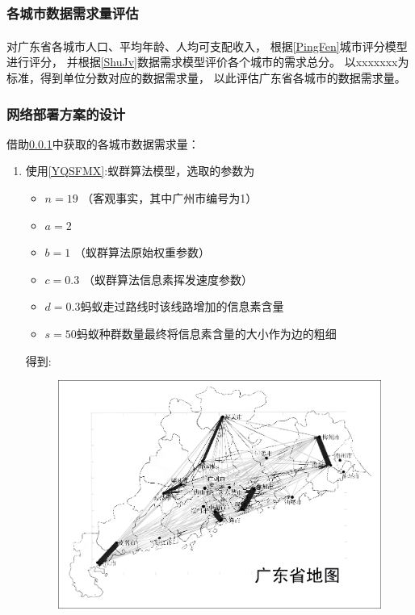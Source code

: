 \documentclass[UTF8,12pt]{ctexart}
\newcommand{\upcite}[1]{\textsuperscript{\cite{#1}}}
\begin{document}
        \subsubsection[网络需求评估]{各城市数据需求量评估}\label{WLXQPG}
            对广东省各城市人口、平均年龄、人均可支配收入\upcite{CSSJ}，
            根据\ref{PingFen}城市评分模型进行评分，
            并根据\ref{ShuJv}数据需求模型评价各个城市的需求总分。
            以xxxxxxx为标准，得到单位分数对应的数据需求量，
            以此评估广东省各城市的数据需求量。

        \subsubsection[网络部署方案]{网络部署方案的设计}    
            借助\ref{WLXQPG}中获取的各城市数据需求量：
            \begin{enumerate}
                \item 使用\ref{YQSFMX}:蚁群算法模型，选取的参数为
                    \begin{itemize}
                        \item $n=19$ （客观事实，其中广州市编号为1）
                        \item $a=2$
                        \item $b=1$ （蚁群算法原始权重参数）
                        \item $c=0.3$ （蚁群算法信息素挥发速度参数）
                        \item $d=0.3$蚂蚁走过路线时该线路增加的信息素含量
                        \item $s=50$蚂蚁种群数量最终将信息素含量的大小作为边的粗细
                    \end{itemize}
                得到:
                    \begin{figure}[H]
                      \centering
                      \includegraphics[scale=0.32]{YQSF.png}   %

\end{figure}
\end{enumerate}
\end{document}
